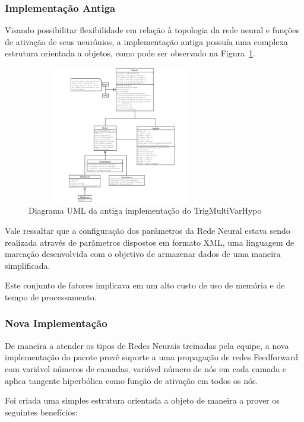 \documentclass[a4paper,10pt,titlepage]{article}
\begin{document}
\subsubsection{Implementação Antiga}

Visando possibilitar flexibilidade em relação à topologia da rede neural e funções de ativação de seus neurônios, a implementação antiga possuía uma complexa estrutura orientada a objetos, como pode ser observado na Figura~\ref{fig:old_tmvh}.

\begin{figure}[htbp!]
 \centering
 \includegraphics[width=8cm,height=6cm]{Figs/tmvh_refactoring/old_tmvh.jpeg}
 \caption{Diagrama UML da antiga implementação do TrigMultiVarHypo}
 \label{fig:old_tmvh}
\end{figure}

Vale ressaltar que a configuração dos parâmetros da Rede Neural estava sendo realizada através de parâmetros dispostos em formato XML, uma linguagem de marcação desenvolvida com o objetivo de armazenar dados de uma maneira simplificada.

Este conjunto de fatores implicava em um alto custo de uso de memória e de tempo de processamento.

\subsubsection{Nova Implementação}

De maneira a atender os tipos de Redes Neurais treinadas pela equipe, a nova implementação do pacote provê suporte a uma propagação de redes Feedforward com variável números de camadas, variável número de nós em cada camada e aplica tangente hiperbólica como função de ativação em todos os nós.

Foi criada uma simples estrutura orientada a objeto de maneira a prover os seguintes benefícios:
\end{document}
